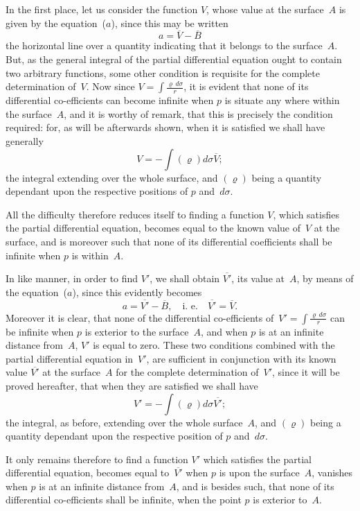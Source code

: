 \documentclass[12pt,notitlepage]{amsart}
\renewcommand{\rho}{\varrho}
\begin{document}
In the first place, let us consider the function $V$, whose value at the
surface~$A$ is given by the equation~($a$), since this may be written
\[
a=\overline{V}-\overline{B}
\]
the horizontal line over a quantity indicating
that it belongs to the surface~$A$.
But, as the general integral of the partial
differential equation ought to contain
two arbitrary functions, some other condition is requisite for the complete
determination of~$V$. Now since $V=\int\frac{\rho\,d\sigma}{r}$,
it is evident that none of its
differential co-efficients can become infinite
when $p$ is situate any where within
the surface~$A$, and it is worthy of remark,
that this is precisely the condition
required: for, as will be afterwards shown,
when it is satisfied we shall have generally
\[
V=-\int(\rho)d\sigma \overline{V};
\]
the integral extending over the whole surface,
and $(\rho)$ being a quantity dependant
upon the respective positions of $p$ and~$d\sigma$.

All the difficulty therefore reduces itself to finding a function $V$, which
satisfies the partial differential equation, becomes equal to the known value
of~$V$ at the surface,
and is moreover such that none of its differential coefficients
shall be infinite when $p$ is within~$A$.

In like manner, in order to find $V'$, we shall obtain
$\overline{V'}$, its value at~$A$,
by means of the equation~($a$), since this evidently becomes
\[
a=\overline{V'}-\overline{B},\quad\text{i.~e.}\quad
\overline{V'}=\overline{V}.
\]
Moreover it is clear, that none of the differential co-efficients
of~${V'=\int\frac{\rho\,d\sigma}{r}}$
can be infinite when $p$ is exterior to the surface~$A$,
and when $p$ is at an
infinite distance from~$A$,
$V'$ is equal to zero. These two conditions combined
with the partial differential equation in~$V'$, are sufficient in conjunction
with its known value $\overline{V'}$
at the surface~$A$ for the complete determination of~$V'$,
since it will be proved hereafter, that when they are satisfied we shall have
\[
V'=-\int(\rho)d\sigma \overline{V'};
\]
the integral, as before, extending over the whole surface~$A$,
and $(\rho)$ being a
quantity dependant upon the respective position of $p$ and~$d\sigma$.

It only remains therefore to find a function $V'$ which satisfies the partial
differential equation, becomes equal to~$\overline{V'}$
when $p$ is upon the surface~$A$, vanishes
when $p$ is at an infinite distance from~$A$, and is besides such, that none of
its differential co-efficients shall be infinite,
when the point $p$ is exterior to~$A$.
\end{document}
